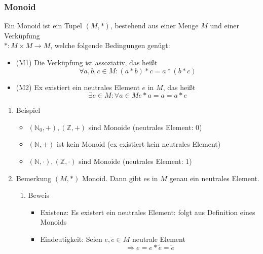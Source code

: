 \documentclass[11pt]{article}
\DeclareMathOperator{\Forall}{\forall}
\begin{document}
\subsubsection{Monoid}
\label{sec-3-1-2}
Ein Monoid ist ein Tupel $(M,*)$, bestehend aus einer Menge $M$ und einer Verküpfung \\
    $*:M\times M \to M$, welche folgende Bedingungen genügt:
\begin{itemize}
\item (M1) Die Verküpfung ist assoziativ, das heißt \[\Forall a,b,c\in M:(a*b)*c = a*(b*c) \]
\item (M2) Ex existiert ein neutrales Element $e$ in $M$, das heißt \[\exists e\in M:\Forall a\in M e*a = a = a*e\]
\end{itemize}
\begin{enumerate}
\item Beispiel
\label{sec-3-1-2-1}
\begin{itemize}
\item $(\mathbb{N}_0,+), (\mathbb{Z},+)$ sind Monoide (neutrales Element: $0$)
\item $(\mathbb{N},+)$ ist kein Monoid (ex existiert kein neutrales Element)
\item $(\mathbb{N},\cdot),(\mathbb{Z},\cdot)$ sind Monoide (neutrales Element: $1$)
\end{itemize}
\item Bemerkung
\label{sec-3-1-2-2}
$(M,*)$ Monoid. Dann gibt es in $M$ genau ein neutrales Element.
\begin{enumerate}
\item Beweis
\label{sec-3-1-2-2-1}
\begin{itemize}
\item Existenz: Es existert ein neutrales Element: folgt aus Definition eines Monoids
\item Eindeutigkeit: Seien $e,\tilde e \in M$ neutrale Element \[\Rightarrow e = e * \tilde e = \tilde e\]
\end{itemize}
\end{enumerate}
\end{enumerate}
\end{document}

